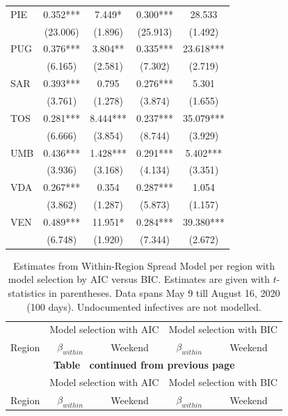 \documentclass[12pt]{article}
\begin{document}
\begin{appendices}
\begin{longtable}{@{}lcccc@{}}
            PIE & 0.352*** & 7.449* & 0.300*** & 28.533 \\ 
             & (23.006) & (1.896) & (25.913) & (1.492) \\ 
            PUG & 0.376*** & 3.804** & 0.335*** & 23.618*** \\ 
             & (6.165) & (2.581) & (7.302) & (2.719) \\ 
            SAR & 0.393*** & 0.795 & 0.276*** & 5.301 \\ 
             & (3.761) & (1.278) & (3.874) & (1.655) \\ 
            TOS & 0.281*** & 8.444*** & 0.237*** & 35.079*** \\ 
             & (6.666) & (3.854) & (8.744) & (3.929) \\ 
            UMB & 0.436*** & 1.428*** & 0.291*** & 5.402*** \\ 
             & (3.936) & (3.168) & (4.134) & (3.351) \\ 
            VDA & 0.267*** & 0.354 & 0.287*** & 1.054 \\ 
             & (3.862) & (1.287) & (5.873) & (1.157) \\ 
            VEN & 0.489*** & 11.951* & 0.284*** & 39.380*** \\ 
             & (6.748) & (1.920) & (7.344) & (2.672) \\* \bottomrule
    	\end{longtable}
		
		\begin{longtable}{@{}lcccc@{}}
    		\caption{Estimates from Within-Region Spread Model per region with model selection by AIC versus BIC. Estimates are given with $t$-statistics in parentheses. Data spans May 9 till August 16, 2020 (100 days). Undocumented infectives are not modelled.}
    		\label{tab:model_within_aic_vs_bic}\\
    		\toprule
    		                & \multicolumn{2}{c}{Model selection with AIC} & \multicolumn{2}{c}{Model selection with BIC} \\
    		                \cmidrule(lr){2-3}
                            \cmidrule(lr){4-5}
    		Region          & $\beta_{within}$ & Weekend & $\beta_{within}$ & Weekend \\* \midrule
    		\endfirsthead
    		
    		\multicolumn{5}{c}{{\bfseries Table \thetable\ continued from previous page}} \\
    		\toprule
    		                & \multicolumn{2}{c}{Model selection with AIC} & \multicolumn{2}{c}{Model selection with BIC} \\
    		                \cmidrule(lr){2-3}
                            \cmidrule(lr){4-5}
    		Region          & $\beta_{within}$ & Weekend & $\beta_{within}$ & Weekend \\* \midrule
    		\endhead
    		

\end{longtable}
\end{appendices}
\end{document}
